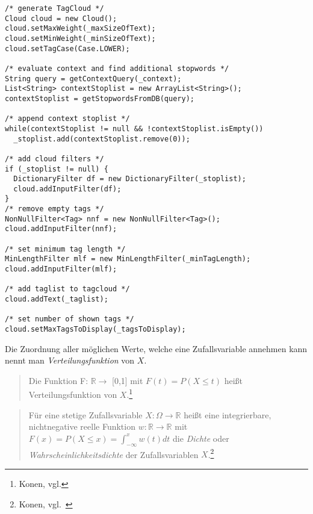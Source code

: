 
\lstset{language=java}
\begin{lstlisting}[frame=htrbl, caption={Das Listing zeigt Java Quellcode}, label={lst:result2}]
/* generate TagCloud */
Cloud cloud = new Cloud();
cloud.setMaxWeight(_maxSizeOfText);
cloud.setMinWeight(_minSizeOfText);
cloud.setTagCase(Case.LOWER);
	    
/* evaluate context and find additional stopwords */
String query = getContextQuery(_context);
List<String> contextStoplist = new ArrayList<String>();
contextStoplist = getStopwordsFromDB(query);
	    
/* append context stoplist */
while(contextStoplist != null && !contextStoplist.isEmpty())
  _stoplist.add(contextStoplist.remove(0));
	    
/* add cloud filters */
if (_stoplist != null) {
  DictionaryFilter df = new DictionaryFilter(_stoplist);
  cloud.addInputFilter(df);
}
/* remove empty tags */
NonNullFilter<Tag> nnf = new NonNullFilter<Tag>();
cloud.addInputFilter(nnf);

/* set minimum tag length */
MinLengthFilter mlf = new MinLengthFilter(_minTagLength);
cloud.addInputFilter(mlf);

/* add taglist to tagcloud */
cloud.addText(_taglist);

/* set number of shown tags */	    
cloud.setMaxTagsToDisplay(_tagsToDisplay);
\end{lstlisting}


Die Zuordnung aller möglichen Werte, welche eine Zufallsvariable annehmen kann nennt man \emph{Verteilungsfunktion} von $X$.

\begin{quotation}
Die Funktion F: $\mathbb{R} \rightarrow$ [0,1] mit $F(t) = P (X \le t)$ heißt Verteilungsfunktion von $X$.\footnote{Konen, vgl.}
\end{quotation}

\begin{quotation}
Für eine stetige Zufallsvariable $X: \Omega \rightarrow \mathbb{R}$ heißt eine integrierbare, nichtnegative reelle Funktion $w: \mathbb{R} \rightarrow \mathbb{R}$ mit $F(x) = P(X \le x) = \int_{-\infty}^{x} w(t)dt$ die \emph{Dichte} oder \emph{Wahrscheinlichkeitsdichte} der Zufallsvariablen $X$.\footnote{Konen, vgl.~}
\end{quotation}
